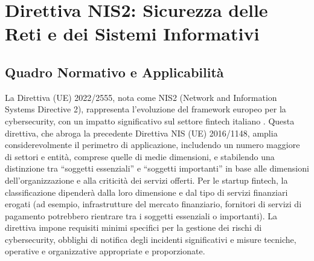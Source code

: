 \section{Direttiva NIS2: Sicurezza delle Reti e dei Sistemi Informativi}
\label{sec:nis2}

\subsection{Quadro Normativo e Applicabilità}
La Direttiva (UE) 2022/2555, nota come NIS2 (Network and Information Systems Directive 2), rappresenta l'evoluzione del framework europeo per la cybersecurity, con un impatto significativo sul settore fintech italiano \cite{cybersecurity360NIS2}. Questa direttiva, che abroga la precedente Direttiva NIS (UE) 2016/1148, amplia considerevolmente il perimetro di applicazione, includendo un numero maggiore di settori e entità, comprese quelle di medie dimensioni, e stabilendo una distinzione tra \enquote{soggetti essenziali} e \enquote{soggetti importanti} in base alle dimensioni dell'organizzazione e alla criticità dei servizi offerti. Per le startup fintech, la classificazione dipenderà dalla loro dimensione e dal tipo di servizi finanziari erogati (ad esempio, infrastrutture del mercato finanziario, fornitori di servizi di pagamento potrebbero rientrare tra i soggetti essenziali o importanti). La direttiva impone requisiti minimi specifici per la gestione dei rischi di cybersecurity, obblighi di notifica degli incidenti significativi e misure tecniche, operative e organizzative appropriate e proporzionate.

